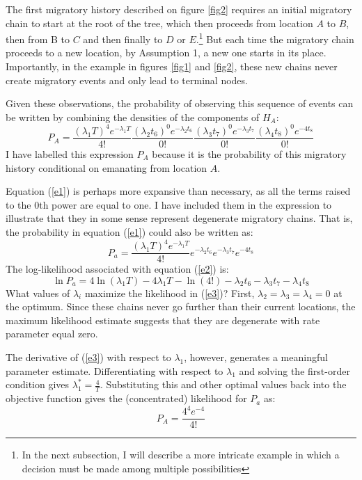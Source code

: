 \documentclass[11pt]{article}
\begin{document}
The first migratory history described on figure \ref{fig2} requires an initial migratory chain to start at the root of the tree, which then proceeds from location $A$ to $B$, then from B to $C$ and then finally to $D$ or $E$.\footnote{In the next subsection, I will describe a more intricate example in which a decision must be made among multiple possibilities} But each time the migratory chain proceeds to a new location, by Assumption 1, a new one starts in its place. Importantly, in the example in figures \ref{fig1} and \ref{fig2}, these new chains never create migratory events and only lead to terminal nodes. 

Given these observations, the probability of observing this sequence of events can be written by combining the densities of the components of  $H_A$:
\begin{equation} \label{e1}
P_A = \frac{(\lambda_1 T)^4e^{-\lambda_1T}}{4!}\frac{(\lambda_2 t_6)^0e^{-\lambda_2t_6}}{0!}\frac{(\lambda_3 t_7)^0e^{-\lambda_3t_7}}{0!}\frac{(\lambda_4 t_8)^0e^{-4t_8}}{0!}
\end{equation} 
I have labelled this expression $P_A$ because it is the probability of this migratory history conditional on emanating from location $A$.

Equation (\ref{e1}) is perhaps more expansive than necessary, as all the terms raised to the $0$th power are equal to one. I have included them in the expression to illustrate that they in some sense represent degenerate migratory chains. That is, the probability in equation (\ref{e1}) could also be written as:
\begin{equation} \label{e2}
P_a = \frac{(\lambda_1 T)^4e^{-\lambda_1T}}{4!}e^{-\lambda_2t_6}e^{-\lambda_3t_7}e^{-4t_8}
\end{equation} 
The log-likelihood associated with equation (\ref{e2}) is:
\begin{equation} \label{e3}
\ln P_a  = 4\ln(\lambda_1 T) -4\lambda_1T-\ln(4!)-\lambda_2t_6-\lambda_3t_7-\lambda_4t_8
\end{equation} 
What values of $\lambda_i$ maximize the likelihood in (\ref{e3})? First, $\lambda_2=\lambda_3=\lambda_4=0$ at the optimum. Since these chains never go further than their current locations, the maximum likelihood estimate suggests that they are degenerate with rate parameter equal zero. 

The derivative of (\ref{e3}) with respect to $\lambda_1$, however, generates a meaningful parameter estimate. Differentiating with respect to $\lambda_1$ and solving the first-order condition gives $\lambda_1^*=\frac{4}{T}$. Substituting this and other optimal values back into the objective function gives the (concentrated) likelihood for $P_a$ as:
\begin{equation}  \label{l3}
P_A=\frac{4^4e^{-4}}{4!}
\end{equation}
\end{document}
